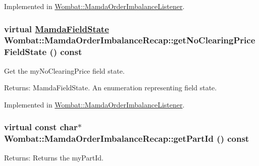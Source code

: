 Implemented in \hyperlink{classWombat_1_1MamdaOrderImbalanceListener_c9c3e649371b664623b47f1153927024}{Wombat::Mamda\-Order\-Imbalance\-Listener}.\hypertarget{classWombat_1_1MamdaOrderImbalanceRecap_51b77c591dfe229e9c977d1c72e93536}{
\subsubsection[getNoClearingPriceFieldState]{\setlength{\rightskip}{0pt plus 5cm}virtual \hyperlink{namespaceWombat_93aac974f2ab713554fd12a1fa3b7d2a}{Mamda\-Field\-State} Wombat::Mamda\-Order\-Imbalance\-Recap::get\-No\-Clearing\-Price\-Field\-State () const}}
\label{classWombat_1_1MamdaOrderImbalanceRecap_51b77c591dfe229e9c977d1c72e93536}


Get the my\-No\-Clearing\-Price field state. 

\begin{Desc}
\item[Returns:]Mamda\-Field\-State. An enumeration representing field state. \end{Desc}


Implemented in \hyperlink{classWombat_1_1MamdaOrderImbalanceListener_c0d44a700d7ff3107cd46c0531c4634f}{Wombat::Mamda\-Order\-Imbalance\-Listener}.\hypertarget{classWombat_1_1MamdaOrderImbalanceRecap_a6b1ce60263dc71feb68e3387359f31e}{
\subsubsection[getPartId]{\setlength{\rightskip}{0pt plus 5cm}virtual const char$\ast$ Wombat::Mamda\-Order\-Imbalance\-Recap::get\-Part\-Id () const}}
\label{classWombat_1_1MamdaOrderImbalanceRecap_a6b1ce60263dc71feb68e3387359f31e}


\begin{Desc}
\item[Returns:]Returns the my\-Part\-Id. \end{Desc}


